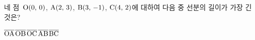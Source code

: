 네 점~$\mathrm{O}(0,\mkern3mu 0)$, $\mathrm{A}(2,\mkern3mu 3)$, $\mathrm{B}(3,\mkern3mu -1)$, $\mathrm{C}(4,\mkern3mu 2)$에 대하여 다음 중 선분의 길이가 가장 긴 것은?
\begin{choices32}{$\overline{\mathrm{OA}}$}{$\overline{\mathrm{OB}}$}{$\overline{\mathrm{OC}}$}{$\overline{\mathrm{AB}}$}{$\overline{\mathrm{BC}}$}\end{choices32}
